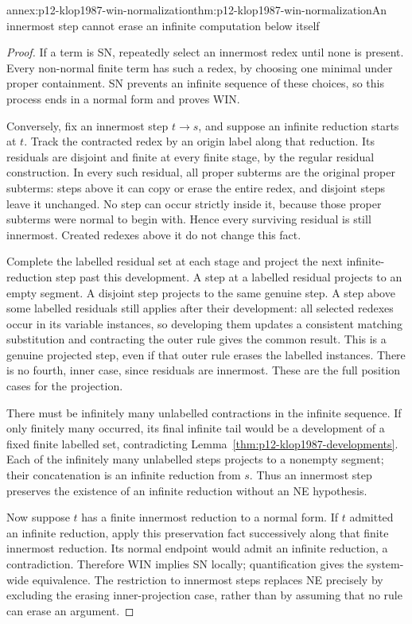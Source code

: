 \begin{annexitem}{annex:p12-klop1987-win-normalization}{thm:p12-klop1987-win-normalization}{An innermost step cannot erase an infinite computation below itself}
\begin{proof}
If a term is SN, repeatedly select an innermost redex until none is
present. Every non-normal finite term has such a redex, by choosing one
minimal under proper containment. SN prevents an infinite sequence of
these choices, so this process ends in a normal form and proves WIN.

Conversely, fix an innermost step \(t\to s\), and suppose an infinite
reduction starts at \(t\). Track the contracted redex by an origin
label along that reduction. Its residuals are disjoint and finite at
every finite stage, by the regular residual construction. In every such
residual, all proper subterms are the original proper subterms: steps
above it can copy or erase the entire redex, and disjoint steps leave it
unchanged. No step can occur strictly inside it, because those proper
subterms were normal to begin with. Hence every surviving residual is
still innermost. Created redexes above it do not change this fact.

Complete the labelled residual set at each stage and project the next
infinite-reduction step past this development. A step at a labelled
residual projects to an empty segment. A disjoint step projects to the
same genuine step. A step above some labelled residuals still applies
after their development: all selected redexes occur in its variable
instances, so developing them updates a consistent matching substitution
and contracting the outer rule gives the common result. This is a
genuine projected step, even if that outer rule erases the labelled
instances. There is no fourth, inner case, since residuals are innermost.
These are the full position cases for the projection.

There must be infinitely many unlabelled contractions in the infinite
sequence. If only finitely many occurred, its final infinite tail would
be a development of a fixed finite labelled set, contradicting
Lemma~\ref{thm:p12-klop1987-developments}. Each of the infinitely many
unlabelled steps projects to a nonempty segment; their concatenation
is an infinite reduction from \(s\). Thus an innermost step preserves
the existence of an infinite reduction without an NE hypothesis.

Now suppose \(t\) has a finite innermost reduction to a normal form.
If \(t\) admitted an infinite reduction, apply this preservation fact
successively along that finite innermost reduction. Its normal endpoint
would admit an infinite reduction, a contradiction. Therefore WIN
implies SN locally; quantification gives the system-wide equivalence.
The restriction to innermost steps replaces NE precisely by excluding
the erasing inner-projection case, rather than by assuming that no rule
can erase an argument.
\end{proof}
\end{annexitem}

